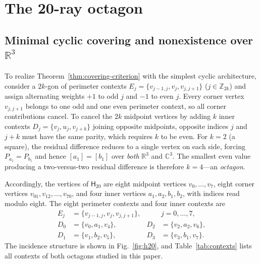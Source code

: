 \documentclass[twocolumn,aps,pra,floatfix,amsmath,amssymb,longbibliography]{revtex4-2}
\newenvironment{handrewrite}{\leavevmode\color{blue}}{}
\theoremstyle{definition}
\theoremstyle{remark}
\newcommand{\C}{\mathbb C}
\newcommand{\R}{\mathbb R}
\newcommand{\Htwenty}{\mathsf H_{20}}
\begin{document}
\section{The 20-ray octagon}
\label{sec:h20}

\subsection{Minimal cyclic covering and nonexistence over
\texorpdfstring{$\R^3$}{R3}}

\begin{handrewrite}
To realize Theorem~\ref{thm:covering-criterion} with the simplest cyclic
architecture, consider a $2k$-gon of perimeter contexts
$E_j=\{v_{j-1,j},v_j,v_{j,j+1}\}$ ($j\in\mathbb Z_{2k}$) and assign
alternating weights $+1$ to odd $j$ and $-1$ to even $j$.  Every corner
vertex $v_{j,j+1}$ belongs to one odd and one even perimeter context, so all
corner contributions cancel.  To cancel the $2k$ midpoint vertices by adding
$k$ inner contexts $D_j=\{v_j,u_j,v_{j+k}\}$ joining opposite midpoints,
opposite indices $j$ and $j+k$ must have the same parity, which requires $k$
to be even.  For $k=2$ (a square), the residual difference reduces to a
single vertex on each side, forcing $P_{a_1}=P_{b_1}$ and hence
$[a_1]=[b_1]$ over \emph{both} $\R^3$ and $\C^3$.  The smallest even value
producing a two-versus-two residual difference is therefore $k=4$---an
\emph{octagon}.
\end{handrewrite}

Accordingly, the vertices of $\Htwenty$ are eight midpoint vertices
$v_0,\ldots,v_7$, eight corner vertices
$v_{01},v_{12},\ldots,v_{70}$, and four inner vertices
$a_1,a_2,b_1,b_2$, with indices read modulo eight.  The eight perimeter
contexts and four inner contexts are
\begin{align}
 E_j&=\{v_{j-1,j},v_j,v_{j,j+1}\}, &&j=0,\ldots,7,
 \label{eq:perimeter-contexts}\\
 D_0&=\{v_0,a_1,v_4\},&D_2&=\{v_2,a_2,v_6\},\nonumber\\
 D_1&=\{v_1,b_2,v_5\},&D_3&=\{v_3,b_1,v_7\}.
 \label{eq:inner-contexts}
\end{align}
The incidence structure is shown in Fig.~\ref{fig:h20}, and
Table~\ref{tab:contexts} lists all contexts of both octagons studied in this
paper.
\end{document}
